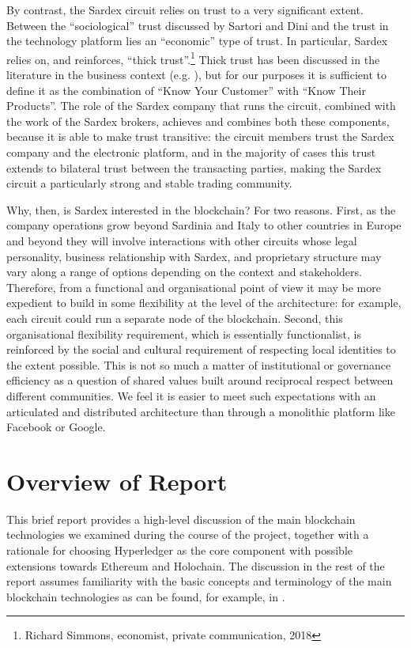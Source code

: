 By contrast, the Sardex circuit relies on trust to a very significant extent. Between the ``sociological'' trust discussed by Sartori and Dini \cite{SartoriDini2016} and the trust in the technology platform lies an ``economic'' type of trust. In particular, Sardex relies on, and reinforces, ``thick trust''.\footnote{Richard Simmons, economist, private communication, 2018} Thick trust has been discussed in the literature in the business context (e.g. \cite{VosselmanMeerKooistra2009}), but for our purposes it is sufficient to define it as the combination of ``Know Your Customer'' with ``Know Their Products''. The role of the Sardex company that runs the circuit, combined with the work of the Sardex brokers, achieves and combines both these components, because it is able to make trust transitive: the circuit members trust the Sardex company and the electronic platform, and in the majority of cases this trust extends to bilateral trust between the transacting parties, making the Sardex circuit a particularly strong and stable trading community.

Why, then, is Sardex interested in the blockchain? For two reasons. First, as the company operations grow beyond Sardinia and Italy to other countries in Europe and beyond they will involve interactions with other circuits whose legal personality, business relationship with Sardex, and proprietary structure may vary along a range of options depending on the context and stakeholders. Therefore, from a functional and organisational point of view it may be more expedient to build in some flexibility at the level of the architecture: for example, each circuit could run a separate node of the blockchain. Second, this organisational flexibility requirement, which is essentially functionalist, is reinforced by the social and cultural requirement of respecting local identities to the extent possible. This is not so much a matter of institutional or governance efficiency as a question of shared values built around reciprocal respect between different communities. We feel it is easier to meet such expectations with an articulated and distributed architecture than through a monolithic platform like Facebook or Google.

\section{Overview of Report}
This brief report provides a high-level discussion of the main blockchain technologies we examined during the course of the project, together with a rationale for choosing Hyperledger as the core component with possible extensions towards Ethereum and Holochain. The discussion in the rest of the report assumes familiarity with the basic concepts and terminology of the main blockchain technologies as can be found, for example, in \cite{TascaEtAl2017}.

